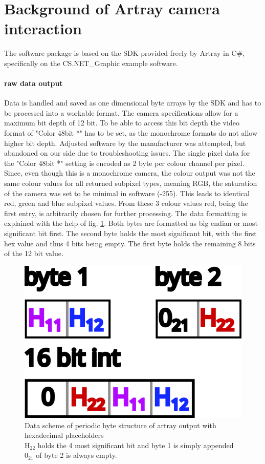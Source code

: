 \documentclass[twoside,openright]{scrreprt}
\begin{document}
\section{Background of Artray camera interaction}
The software package is based on the SDK provided freely by Artray in C\#, specifically on the CS.NET\_Graphic example software. 

\paragraph{raw data output}
Data is handled and saved as one dimensional byte arrays by the SDK and has to be processed into a workable format.  The camera specifications allow for a maximum bit depth of 12 bit. To be able to access this bit depth the video format of "Color 48bit *" has to be set, as the monochrome formats do not allow higher bit depth. Adjusted software by the manufacturer was attempted, but abandoned on our side due to troubleshooting issues. The single pixel data for the "Color 48bit *" setting is encoded as 2 byte per colour channel per pixel. Since, even though this is a monochrome camera, the colour output was not the same colour values for all returned subpixel types, meaning RGB, the saturation of the camera was set to be minimal in software (-255). This leads to identical red, green and blue subpixel values. From these 3 colour values red, being the first entry, is arbitrarily chosen for further processing.
The data formatting is explained with the help of fig. \ref{fig:ByteArtrayOut}. Both bytes are formatted as big endian or most significant bit first. The second byte holds the most significant bit, with the first hex value and thus 4 bits being empty. The first byte holds the remaining 8 bits of the 12 bit value.

\begin{figure}[hbtp]
\centering
\includegraphics[scale=1]{images/ArtrayByteImage.png}
\caption{Data scheme of periodic byte structure of artray output with hexadecimal placeholders\\
$\mathrm{H_{22}}$ holds the 4 most significant bit and byte 1 is simply appended\\
$\mathrm{0_{21}}$ of byte 2 is always empty.\label{fig:ByteArtrayOut}}
\end{figure}
\end{document}
